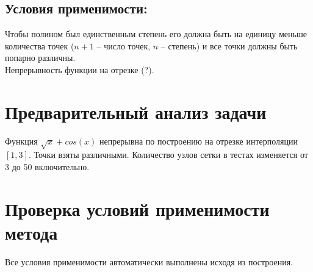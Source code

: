 \documentclass[12pt]{article}
\begin{document}
\subsection{Условия применимости:}
 Чтобы полином был единственным степень его должна быть на единицу меньше количества точек ($n+1$ – число точек, $n$ – степень) и все точки должны быть попарно различны.\\
 Непрерывность функции на отрезке (?).
\section{Предварительный анализ задачи}
Функция $\displaystyle \sqrt{x} + cos(x)$ непрерывна по построению на отрезке интерполяции $[1,3]$.
Точки взяты различными. Количество узлов сетки в тестах изменяется от 3 до 50 включительно.
\section{Проверка условий применимости метода}
Все условия применимости автоматически выполнены исходя из построения.
\end{document}
